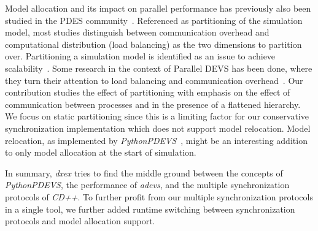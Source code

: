 Model allocation and its impact on parallel performance has previously also been studied in the \textsf{PDES} community~\cite{PDESpartitioning}.
Referenced as partitioning of the simulation model, most studies distinguish between communication overhead and computational distribution (load balancing) as the two dimensions to partition over.
Partitioning a simulation model is identified as an issue to achieve scalability~\cite{Scalability}. 
Some research in the context of \textsf{Parallel DEVS} has been done, where they turn their attention to load balancing and communication overhead~\cite{PDEVSpartitioning, NonFragmenting}.
Our contribution studies the effect of partitioning with emphasis on the effect of communication between processes and in the presence of a flattened hierarchy. 
We focus on static partitioning since this is a limiting factor for our conservative synchronization implementation which does not support model relocation.
Model relocation, as implemented by \textit{PythonPDEVS}~\cite{PythonPDEVS2}, might be an interesting addition to only model allocation at the start of simulation.

In summary, \textit{dxex} tries to find the middle ground between the concepts of \textit{PythonPDEVS}, the performance of \textit{adevs}, and the multiple synchronization protocols of \textit{CD++}.
To further profit from our multiple synchronization protocols in a single tool, we further added runtime switching between synchronization protocols and model allocation support.
